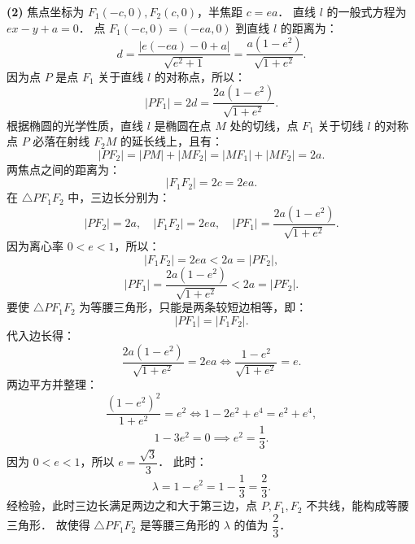 \begin{answer}
\textbf{(2)}
焦点坐标为 $F_1(-c, 0), F_2(c, 0)$，半焦距 $c = ea$．
直线 $l$ 的一般式方程为 $ex - y + a = 0$．
点 $F_1(-c, 0) = (-ea, 0)$ 到直线 $l$ 的距离为：
\nopagebreak[4]
\[
d = \frac{|e(-ea) - 0 + a|}{\sqrt{e^2 + 1}} = \frac{a(1 - e^2)}{\sqrt{1 + e^2}}.
\]
因为点 $P$ 是点 $F_1$ 关于直线 $l$ 的对称点，所以：
\nopagebreak[4]
\[
|PF_1| = 2d = \frac{2a(1 - e^2)}{\sqrt{1 + e^2}}.
\]
根据椭圆的光学性质，直线 $l$ 是椭圆在点 $M$ 处的切线，点 $F_1$ 关于切线 $l$ 的对称点 $P$ 必落在射线 $F_2M$ 的延长线上，且有：
\nopagebreak[4]
\[
|PF_2| = |PM| + |MF_2| = |MF_1| + |MF_2| = 2a.
\]
两焦点之间的距离为：
\nopagebreak[4]
\[
|F_1F_2| = 2c = 2ea.
\]
在 $\triangle PF_1F_2$ 中，三边长分别为：
\nopagebreak[4]
\[
|PF_2| = 2a, \quad |F_1F_2| = 2ea, \quad |PF_1| = \frac{2a(1 - e^2)}{\sqrt{1 + e^2}}.
\]
因为离心率 $0 < e < 1$，所以：
\nopagebreak[4]
\[
|F_1F_2| = 2ea < 2a = |PF_2|,
\]
\nopagebreak[4]
\[
|PF_1| = \frac{2a(1 - e^2)}{\sqrt{1 + e^2}} < 2a = |PF_2|.
\]
要使 $\triangle PF_1F_2$ 为等腰三角形，只能是两条较短边相等，即：
\nopagebreak[4]
\[
|PF_1| = |F_1F_2|.
\]
代入边长得：
\nopagebreak[4]
\[
\frac{2a(1 - e^2)}{\sqrt{1 + e^2}} = 2ea \iff \frac{1 - e^2}{\sqrt{1 + e^2}} = e.
\]
两边平方并整理：
\nopagebreak[4]
\[
\frac{(1 - e^2)^2}{1 + e^2} = e^2 \iff 1 - 2e^2 + e^4 = e^2 + e^4,
\]
\nopagebreak[4]
\[
1 - 3e^2 = 0 \implies e^2 = \frac{1}{3}.
\]
因为 $0 < e < 1$，所以 $e = \dfrac{\sqrt{3}}{3}$．
此时：
\nopagebreak[4]
\[
\lambda = 1 - e^2 = 1 - \frac{1}{3} = \frac{2}{3}.
\]
经检验，此时三边长满足两边之和大于第三边，点 $P, F_1, F_2$ 不共线，能构成等腰三角形．
故使得 $\triangle PF_1F_2$ 是等腰三角形的 $\lambda$ 的值为 $\dfrac{2}{3}$．



\end{answer}
